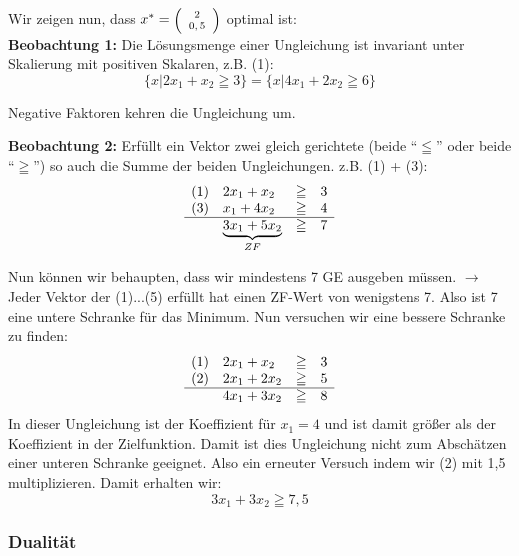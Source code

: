 Wir zeigen nun, dass $x^{*} =
\mbox{\scriptsize$\left(\begin{array}{c}2\\0,5\end{array}\right)$}$ optimal
ist:\\
{\bf Beobachtung 1:} Die Lösungsmenge einer Ungleichung ist invariant
unter Skalierung mit positiven Skalaren, z.B. (1):
\[\{x|2x_{1}+x_{2} \geqq 3\} = \{x|4x_{1}+2x_{2} \geqq 6\}\]

Negative Faktoren kehren die Ungleichung um.

{\bf Beobachtung 2:} Erfüllt ein Vektor zwei gleich gerichtete (beide
"`$\leqq$"' oder beide "`$\geqq$"') so auch die Summe der beiden
Ungleichungen. z.B. (1) + (3):
\[\begin{array}{llcl}
(1)&2x_{1}+x_{2} &\geqq& 3\\
(3)&x_{1}+4x_{2}&\geqq&4\\
\hline
&\underbrace{3x_{1} + 5x_{2}}_{ZF}&\geqq& 7
\end{array}\] 

Nun können wir behaupten, dass wir mindestens 7 GE ausgeben müssen.
$\rightarrow$ Jeder Vektor der (1)...(5) erfüllt hat einen ZF-Wert von
wenigstens 7. Also ist 7 eine untere Schranke für das Minimum. Nun versuchen
wir eine bessere Schranke zu finden:
\[\begin{array}{llcl}
(1)&2x_{1}+x_{2} &\geqq& 3\\
(2)&2x_{1}+2x_{2}&\geqq&5\\
\hline
&4x_{1} + 3x_{2}&\geqq& 8
\end{array}\]
In dieser Ungleichung ist der Koeffizient für $x_{1} = 4$  und ist damit
größer als der Koeffizient in der Zielfunktion. Damit ist dies Ungleichung
nicht zum Abschätzen einer unteren Schranke geeignet. Also ein erneuter
Versuch indem wir (2) mit 1,5 multiplizieren. Damit erhalten wir:
\[3x_{1}+3x_{2} \geqq 7,5\]

\subsubsection{Dualität}

